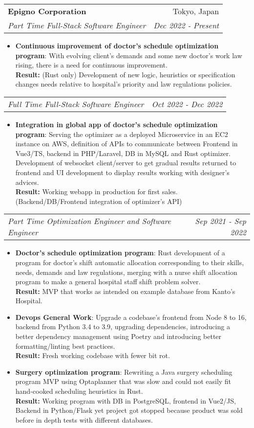 \documentclass[letterpaper,11pt]{article}
\makeatletter
\newcommand{\resumeItem}[2]{
  \item\small{
    \textbf{#1}{: #2 \vspace{-2pt}}
  }
}
\newcommand{\resumeSubheading}[4]{
  \vspace{-1pt}\item
    \begin{tabular*}{0.97\textwidth}[t]{l@{\extracolsep{\fill}}r}
      \textbf{#1} & #2 \\
      \textit{\small#3} & \textit{\small #4} \\
    \end{tabular*}\vspace{-5pt}
}
\newcommand{\resumeSubSubheading}[2]{
    \begin{tabular*}{0.97\textwidth}{l@{\extracolsep{\fill}}r}
      \textit{\small#1} & \textit{\small #2} \\
    \end{tabular*}\vspace{-5pt}
}
\newcommand{\resumeSubHeadingListEnd}{\end{itemize}}
\newcommand{\resumeItemListStart}{\begin{itemize}}
\newcommand{\resumeItemListEnd}{\end{itemize}\vspace{-5pt}}
\makeatother
\begin{document}

    \resumeSubheading
      {Epigno Corporation}{Tokyo, Japan}
      {Part Time Full-Stack Software Engineer}{Dec 2022 - Present}
      \resumeItemListStart
       \resumeItem{Continuous improvement of doctor's schedule optimization program}
         {With evolving client's demands and some new doctor's work law rising, there is a need for continuous improvement.
         \\\textbf{Result:} (Rust only) Development of new logic, heuristics or specification changes needs relative to hospital's priority and law regulations policies.}
      \resumeItemListEnd
   \resumeSubSubheading
      {Full Time Full-Stack Software Engineer}{Oct 2022 - Dec 2022}
      \resumeItemListStart
       \resumeItem{Integration in global app of doctor's schedule optimization program}
         {Serving the optimizer as a deployed Microservice in an EC2 instance on AWS, definition of APIs to communicate between Frontend in Vue3/TS, backend in PHP/Laravel, DB in MySQL and Rust optimizer. Development of websocket client/server to get gradual results returned to frontend and UI development to display results working with designer's advices.
         \\\textbf{Result:} Working webapp in production for first sales. (Backend/DB/Frontend integration of optimizer's API)}
      \resumeItemListEnd
   \resumeSubSubheading
    {Part Time Optimization Engineer and Software Engineer}{Sep 2021 - Sep 2022}
    \resumeItemListStart
       \resumeItem{Doctor's schedule optimization program}
         {Rust development of a program for doctor's shift automatic allocation corresponding to their skills, needs, demands and law regulations, merging with a nurse shift allocation program to make a general hospital staff shift problem solver.
         \\\textbf{Result:} MVP that works as intended on example database from Kanto's Hospital.}
       \resumeItem{Devops General Work}
         {Upgrade a codebase's frontend from Node 8 to 16, backend from Python 3.4 to 3.9, upgrading dependencies, introducing a better dependency management using Poetry and introducing better formatting/linting best practices.
         \\\textbf{Result:} Fresh working codebase with fewer bit rot.}
       \resumeItem{Surgery optimization program}
         {Rewriting a Java surgery scheduling program MVP using Optaplanner that was slow and could not easily fit hand-cooked scheduling heuristics in Rust.
         \\\textbf{Result:} Working program with DB in PostgreSQL, frontend in Vue2/JS, Backend in Python/Flask yet project got stopped because product was sold before in depth tests with different databases.}
    \resumeItemListEnd
\end{document}
